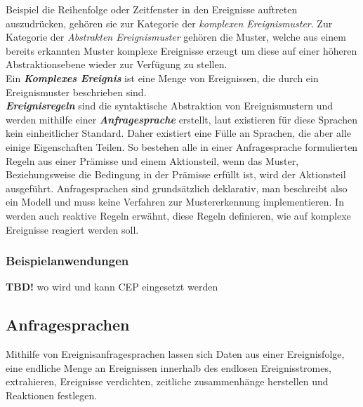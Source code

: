 \documentclass{acm_proc_article-sp}
\begin{document}
Beispiel die Reihenfolge oder Zeitfenster in den Ereignisse auftreten auszudrücken, 
gehören sie zur Kategorie der \textit{komplexen Ereignismuster}. Zur Kategorie der 
\textit{Abstrakten Ereignismuster} gehören die Muster, welche aus einem bereits erkannten 
Muster komplexe Ereignisse erzeugt um diese auf einer höheren Abstraktionsebene wieder 
zur Verfügung zu stellen.\\
Ein \textbf{\textit{Komplexes Ereignis}} ist eine Menge von Ereignissen, die durch ein 
Ereignismuster beschrieben sind.\\\label{begriff-ereignisregel}
\textbf{\textit{Ereignisregeln}} sind die syntaktische Abstraktion von Ereignismustern 
und werden mithilfe einer \textbf{\textit{Anfragesprache}} erstellt, laut \cite{bruns} 
existieren für diese 
Sprachen kein einheitlicher Standard. Daher existiert eine Fülle an Sprachen, die aber 
alle einige Eigenschaften Teilen. So bestehen alle in einer Anfragesprache formulierten 
Regeln aus einer Prämisse und einem Aktionsteil, wenn das Muster, Beziehungsweise die 
Bedingung in der Prämisse erfüllt ist, wird der Aktionsteil ausgeführt. Anfragesprachen 
sind grundsätzlich deklarativ, man beschreibt also ein Modell und muss keine Verfahren 
zur Mustererkennung implementieren. In \cite{eckert} werden auch reaktive Regeln erwähnt, 
diese Regeln definieren, wie auf komplexe Ereignisse reagiert werden soll.

\subsubsection{Beispielanwendungen}
\vspace{0.1cm}

\textbf{TBD!} wo wird und kann CEP eingesetzt werden\\


%
%
\subsection{Anfragesprachen}
\vspace{0.1cm}
Mithilfe von Ereignisanfragesprachen lassen sich Daten aus einer Ereignisfolge, eine 
endliche Menge an Ereignissen innerhalb des endlosen Ereignisstromes, extrahieren, 
Ereignisse verdichten, zeitliche zusammenhänge herstellen und Reaktionen festlegen.
\end{document}
